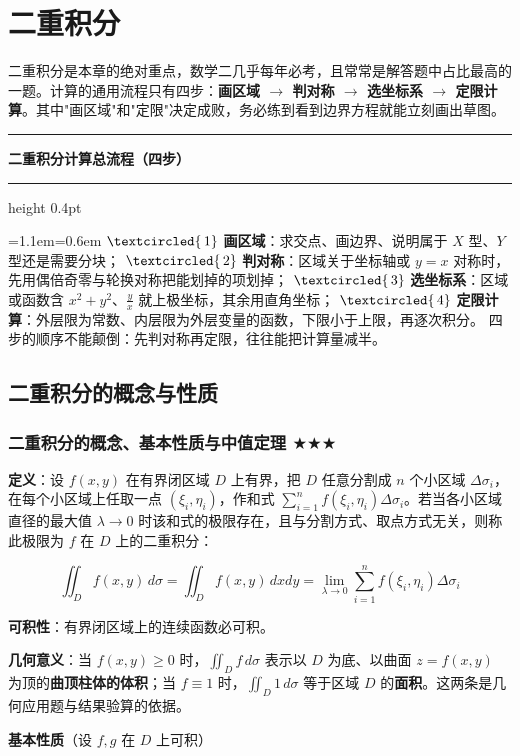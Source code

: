\documentclass[11pt,openany,UTF8]{ctexbook}
\newcommand{\circled}[1]{\textcircled{\scriptsize\,#1}}
\newcommand{\callouthead}[2]{%
  \par\addvspace{7pt}\noindent
  {\color{#1}\rule[-0.15em]{3pt}{1.05em}}\hspace{0.5em}%
  {\bfseries\color{#1}#2}\par\nobreak\vspace{-0.35em}%
  {\color{rulesep}\hrule height 0.4pt}\nobreak\vspace{0.45em}%
  \begingroup\small\setlength{\parindent}{0pt}%
  \leftskip=1.1em\rightskip=0.6em\noindent\ignorespaces}
\newcommand{\calloutend}{\par\endgroup\addvspace{7pt}}
\newenvironment{callkey}[1]{\callouthead{keybar}{#1}}{\calloutend}
\begin{document}
\section{二重积分}

二重积分是本章的绝对重点，数学二几乎每年必考，且常常是解答题中占比最高的一题。计算的通用流程只有四步：\textbf{画区域 $\to$ 判对称 $\to$ 选坐标系 $\to$ 定限计算}。其中"画区域"和"定限"决定成败，务必练到看到边界方程就能立刻画出草图。

\begin{callkey}{二重积分计算总流程（四步）}
$\circled{1}$ \textbf{画区域}：求交点、画边界、说明属于 $X$ 型、$Y$ 型还是需要分块； $\circled{2}$ \textbf{判对称}：区域关于坐标轴或 $y=x$ 对称时，先用偶倍奇零与轮换对称把能划掉的项划掉； $\circled{3}$ \textbf{选坐标系}：区域或函数含 $x^{2}+y^{2}$、$\frac yx$ 就上极坐标，其余用直角坐标； $\circled{4}$ \textbf{定限计算}：外层限为常数、内层限为外层变量的函数，下限小于上限，再逐次积分。 四步的顺序不能颠倒：先判对称再定限，往往能把计算量减半。

\end{callkey}

\subsection{二重积分的概念与性质}

\subsubsection{二重积分的概念、基本性质与中值定理 $\bigstar$$\bigstar$$\bigstar$}

\textbf{定义}：设 $f(x,y)$ 在有界闭区域 $D$ 上有界，把 $D$ 任意分割成 $n$ 个小区域 $\Delta\sigma_i$，在每个小区域上任取一点 $(\xi_i,\eta_i)$，作和式 $\sum_{i=1}^{n}f(\xi_i,\eta_i)\Delta\sigma_i$。若当各小区域直径的最大值 $\lambda\to 0$ 时该和式的极限存在，且与分割方式、取点方式无关，则称此极限为 $f$ 在 $D$ 上的二重积分：

\[\iint_{D}f(x,y)\,d\sigma=\iint_{D}f(x,y)\,dxdy=\lim_{\lambda\to 0}\sum_{i=1}^{n}f(\xi_i,\eta_i)\Delta\sigma_i\]

\textbf{可积性}：有界闭区域上的连续函数必可积。

\textbf{几何意义}：当 $f(x,y)\ge 0$ 时，$\iint_{D}f\,d\sigma$ 表示以 $D$ 为底、以曲面 $z=f(x,y)$ 为顶的\textbf{曲顶柱体的体积}；当 $f\equiv 1$ 时，$\iint_{D}1\,d\sigma$ 等于区域 $D$ 的\textbf{面积}。这两条是几何应用题与结果验算的依据。

\textbf{基本性质}（设 $f,g$ 在 $D$ 上可积）
\end{document}
